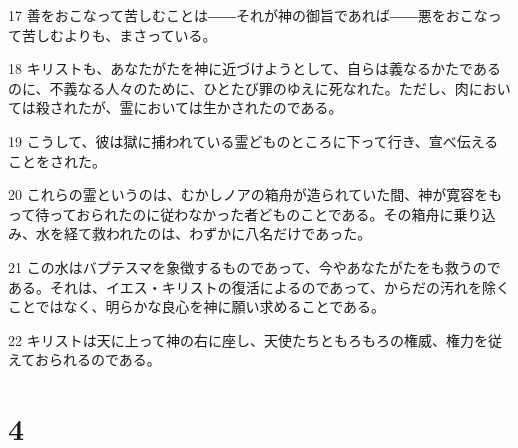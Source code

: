 \par 17 善をおこなって苦しむことは――それが神の御旨であれば――悪をおこなって苦しむよりも、まさっている。
\par 18 キリストも、あなたがたを神に近づけようとして、自らは義なるかたであるのに、不義なる人々のために、ひとたび罪のゆえに死なれた。ただし、肉においては殺されたが、霊においては生かされたのである。
\par 19 こうして、彼は獄に捕われている霊どものところに下って行き、宣べ伝えることをされた。
\par 20 これらの霊というのは、むかしノアの箱舟が造られていた間、神が寛容をもって待っておられたのに従わなかった者どものことである。その箱舟に乗り込み、水を経て救われたのは、わずかに八名だけであった。
\par 21 この水はバプテスマを象徴するものであって、今やあなたがたをも救うのである。それは、イエス・キリストの復活によるのであって、からだの汚れを除くことではなく、明らかな良心を神に願い求めることである。
\par 22 キリストは天に上って神の右に座し、天使たちともろもろの権威、権力を従えておられるのである。

\chapter{4}

